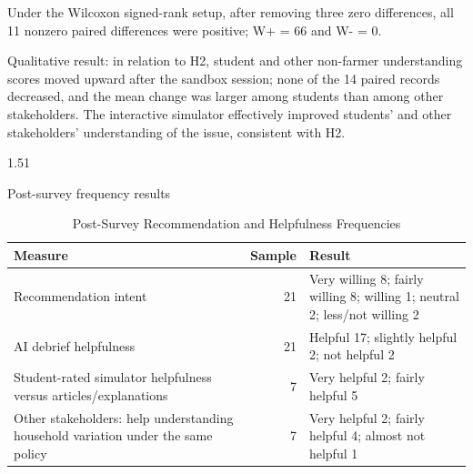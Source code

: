 \documentclass[stu,12pt,floatsintext,donotrepeattitle]{apa7}
\makeatletter
\newcommand{\Sihao}{\fontsize{14pt}{18pt}\selectfont}
\renewcommand{\subsection}{\@startsection{subsection}{2}{\z@}%
  {1.5\baselineskip}{1\baselineskip}%
  {\normalfont\Sihao\bfseries\raggedright}}
\makeatother
\begin{document}
Under the Wilcoxon signed-rank setup, after removing three zero differences, all 11 nonzero paired differences were positive; W+ = 66 and W- = 0.

Qualitative result: in relation to H2, student and other non-farmer understanding scores moved upward after the sandbox session; none of the 14 paired records decreased, and the mean change was larger among students than among other stakeholders. The interactive simulator effectively improved students' and other stakeholders' understanding of the issue, consistent with H2.

\subsection{Post-survey frequency results}

\begin{table}[htbp]
\centering
\footnotesize
\begin{tabularx}{\textwidth}{@{}P{0.34\textwidth}rX@{}}
\toprule
Measure & Sample & Result \\
\midrule
Recommendation intent & 21 & Very willing 8; fairly willing 8; willing 1; neutral 2; less/not willing 2 \\
AI debrief helpfulness & 21 & Helpful 17; slightly helpful 2; not helpful 2 \\
Student-rated simulator helpfulness versus articles/explanations & 7 & Very helpful 2; fairly helpful 5 \\
Other stakeholders: help understanding household variation under the same policy & 7 & Very helpful 2; fairly helpful 4; almost not helpful 1 \\
\bottomrule
\end{tabularx}
\caption{Post-Survey Recommendation and Helpfulness Frequencies}
\label{tab:postsurvey-helpfulness}
\end{table}
\end{document}
